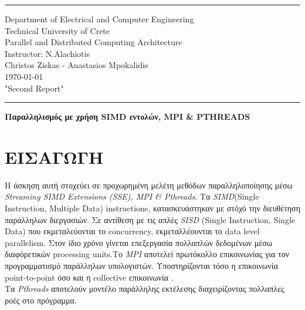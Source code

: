 \documentclass[11pt]{article}
\begin{document}
\noindent\rule{\textwidth}{2pt}
\begin{center}
Department of Electrical and Computer Engineering\\
Technical University of Crete\\
Parallel and Distributed Computing Architecture\\
Instructor: N.Alachiotis\\
Christos Ziskas - Anastasios Mpokalidis \\
\today\\
"Second Report"
\rule{\textwidth}{.5pt}\newline\newline\newline
\noindent

\Large{\textbf{
Παραλληλισμός με χρήση
SIMD
εντολών,
MPI \& PTHREADS}}
\newpage
\end{center}


\section{ΕΙΣΑΓΩΓΗ}
Η άσκηση αυτή στοχεύει σε προχωρημένη μελέτη μεθόδων
παραλληλοποίησης μέσω  \textit{Streaming SIMD Extensions (SSE), MPI \& Pthreads}. Τα  \textit{SIMD}(Single Instruction, Multiple Data) instructions, κατασκευάστηκαν με στόχό την διευθέτηση παράλληλων διεργασιών. Σε αντίθεση με τις απλές   \textit{SISD} (Single Instruction,
Single Data) που εκμεταλεύονται το concurrency, εκμεταλλέουνται το data level parallelism. Στον ίδιο χρόνο γίνεται επεξεργασία πολλαπλών δεδομένων μέσω διαφόρετικών processing units.\break{}Το \textit{MPI}  αποτελεί πρωτόκολλο επικοινωνίας για τον προγραμματισμό παράλληλων υπολογιστών. Υποστηρίζονται τόσο η επικοινωνία point-to-point όσο και η collective επικοινωνία .\\Τα \textit{Pthreads}  αποτελούν μοντέλο παράλληλης εκτέλεσης διαχειρίζοντας πολλαπλες ροές στο πρόγραμμα.
\end{document}
